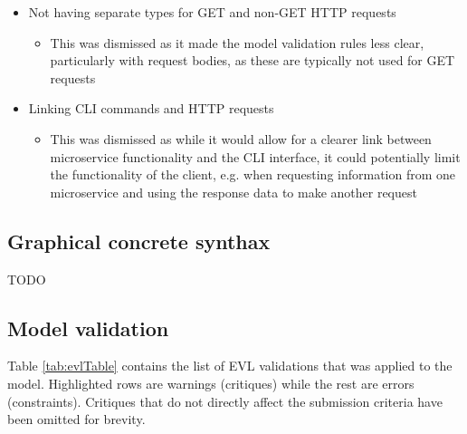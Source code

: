 \documentclass[parskip=full]{article}
\begin{document}
\begin{itemize}
        \item	Not having separate types for GET and non-GET HTTP requests
        \begin{itemize}
        \item This was dismissed as it made the model validation rules less clear, particularly with request bodies, as these are typically not used for GET requests
        \end{itemize}
        \item	Linking CLI commands and HTTP requests
        \begin{itemize}
        \item This was dismissed as while it would allow for a clearer link between microservice functionality and the CLI interface, it could potentially limit the functionality of the client, e.g. when requesting information from one microservice and using the response data to make another request
            \end{itemize}
    \end{itemize}
    \pagebreak
    \subsection{Graphical concrete synthax}
    TODO
    \pagebreak
    \subsection{Model validation}
    Table \ref{tab:evlTable} contains the list of EVL validations that was applied to the model.
    Highlighted rows are warnings (critiques) while the rest are errors (constraints).
    Critiques that do not directly affect the submission criteria have been omitted for brevity.
\end{document}
